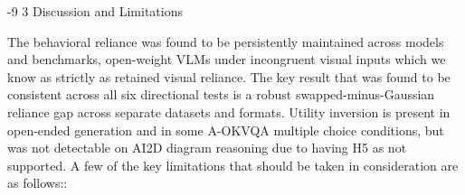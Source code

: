 \documentclass[graybox]{svmult}
\makeatletter
\renewcommand\section{\@startsection{section}{1}{\z@}%
  {-9\p@ \@plus -2\p@ \@minus -1\p@}%
  {3\p@ \@plus 1\p@ \@minus 1\p@}%
  {\normalfont\large\bfseries\boldmath}}
\makeatother
\begin{document}
\section{Discussion and Limitations}
\label{sec:discussion}

The behavioral reliance was found to be persistently maintained across models and benchmarks, open-weight VLMs under incongruent visual inputs which we know as strictly as retained visual reliance. The key result that was found to be consistent across all six directional tests is a robust swapped-minus-Gaussian reliance gap across separate datasets and formats. Utility inversion is present in open-ended generation and in some A-OKVQA multiple choice conditions, but was not detectable on AI2D diagram reasoning due to having H5 as not supported. A few of the key limitations that should be taken in consideration are as follows::
\end{document}
